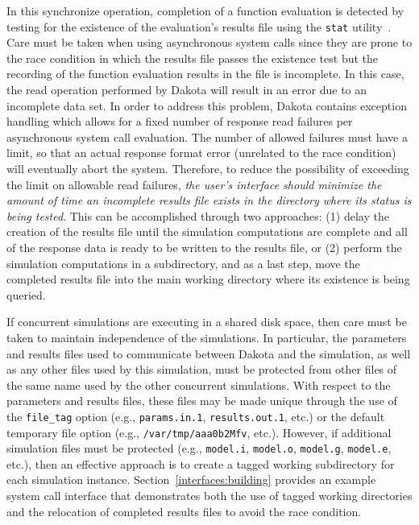 In this synchronize operation, completion of a function evaluation is
detected by testing for the existence of the evaluation's results file
using the \texttt{stat} utility~\cite{Ker88}. Care must be taken when
using asynchronous system calls since they are prone to the race
condition in which the results file passes the existence test but the
recording of the function evaluation results in the file is
incomplete. In this case, the read operation performed by Dakota will
result in an error due to an incomplete data set. In order to address
this problem, Dakota contains exception handling which allows for a
fixed number of response read failures per asynchronous system call
evaluation. The number of allowed failures must have a limit, so that
an actual response format error (unrelated to the race condition) will
eventually abort the system. Therefore, to reduce the possibility of
exceeding the limit on allowable read failures, \emph{the user's
interface should minimize the amount of time an incomplete results
file exists in the directory where its status is being tested}. This
can be accomplished through two approaches: (1) delay the creation of
the results file until the simulation computations are complete and
all of the response data is ready to be written to the results file,
or (2) perform the simulation computations in a subdirectory, and as a
last step, move the completed results file into the main working
directory where its existence is being queried.

If concurrent simulations are executing in a shared disk space, then
care must be taken to maintain independence of the simulations. In
particular, the parameters and results files used to communicate
between Dakota and the simulation, as well as any other files used by
this simulation, must be protected from other files of the same name
used by the other concurrent simulations. With respect to the
parameters and results files, these files may be made unique through
the use of the \texttt{file\_tag} option (e.g., \texttt{params.in.1},
\texttt{results.out.1}, etc.) or the default temporary file
option (e.g., \texttt{/var/tmp/aaa0b2Mfv}, etc.). However, if
additional simulation files must be protected (e.g., \texttt{model.i},
\texttt{model.o}, \texttt{model.g}, \texttt{model.e}, etc.), then an
effective approach is to create a tagged working subdirectory for each
simulation instance. Section~\ref{interfaces:building} provides an example
system call interface that demonstrates both the use of tagged working
directories and the relocation of completed results files to avoid the
race condition.

